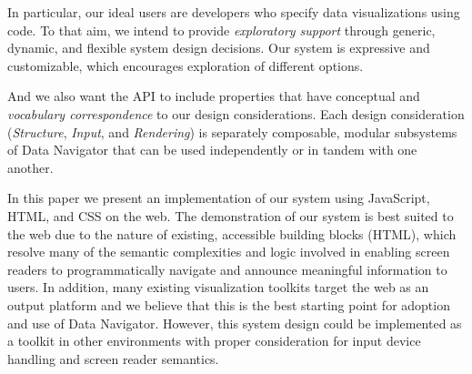 \documentclass[12pt]{cmuthesis}
\begin{document}
In particular, our ideal users are developers who specify data visualizations using code. To that aim, we intend to provide \textit{exploratory support} through generic, dynamic, and flexible system design decisions. Our system is expressive and customizable, which encourages exploration of different options.

And we also want the API to include properties that have conceptual and \textit{vocabulary correspondence} to our design considerations. Each design consideration (\textit{Structure}, \textit{Input}, and \textit{Rendering}) is separately composable, modular subsystems of Data Navigator that can be used independently or in tandem with one another.



In this paper we present an implementation of our system using JavaScript, HTML, and CSS on the web. The demonstration of our system is best suited to the web due to the nature of existing, accessible building blocks (HTML), which resolve many of the semantic complexities and logic involved in enabling screen readers to programmatically navigate and announce meaningful information to users. In addition, many existing visualization toolkits target the web as an output platform and we believe that this is the best starting point for adoption and use of Data Navigator. However, this system design could be implemented as a toolkit in other environments with proper consideration for input device handling and screen reader semantics.
\end{document}
